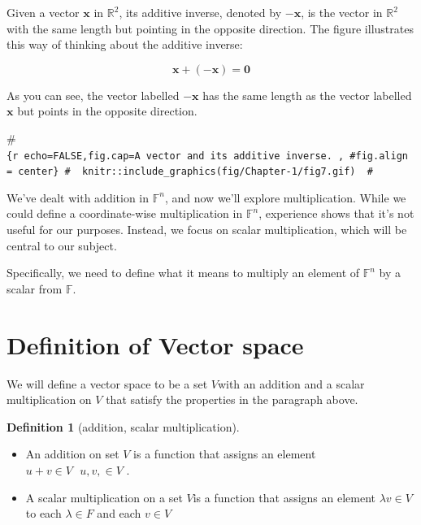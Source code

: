 \documentclass[
]{book}
\providecommand{\tightlist}{%
  \setlength{\itemsep}{0pt}\setlength{\parskip}{0pt}}
\theoremstyle{definition}
\newtheorem{definition}{Definition}[chapter]
\theoremstyle{definition}
\theoremstyle{definition}
\theoremstyle{definition}
\theoremstyle{remark}
\begin{document}
Given a vector \(\mathbf{x}\) in \(\mathbb{R}^2\), its additive inverse, denoted by \(-\mathbf{x}\), is the vector in \(\mathbb{R}^2\) with the same length but pointing in the opposite direction. The figure illustrates this way of thinking about the additive inverse:

\[ \mathbf{x} + (-\mathbf{x}) = \mathbf{0} \]

As you can see, the vector labelled \(-\mathbf{x}\) has the same length as the vector labelled \(\mathbf{x}\) but points in the opposite direction.

\#\texttt{\{r\ echo=FALSE,fig.cap=\textquotesingle{}A\ vector\ and\ its\ additive\ inverse.\textquotesingle{}\ ,\ \#fig.align\ =\ \textquotesingle{}center\textquotesingle{}\}\ \#\ \ knitr::include\_graphics(\textquotesingle{}fig/Chapter-1/fig7.gif\textquotesingle{})\ \ \#}

We've dealt with addition in \(\mathbb{F}^n\), and now we'll explore multiplication. While we could define a coordinate-wise multiplication in \(\mathbb{F}^n\), experience shows that it's not useful for our purposes. Instead, we focus on scalar multiplication, which will be central to our subject.

Specifically, we need to define what it means to multiply an element of \(\mathbb{F}^n\) by a scalar from \(\mathbb{F}\).

\section{Definition of Vector space}\label{definition-of-vector-space}

We will define a vector space to be a set \(V\)with an addition and a scalar multiplication on \(V\) that satisfy the properties in the paragraph above.

\begin{definition}[addition, scalar multiplication]
\protect\hypertarget{def:unnamed-chunk-24}{}\label{def:unnamed-chunk-24}\leavevmode

\begin{itemize}
\tightlist
\item
  An addition on set \(V\) is a function that assigns an element \(u+v\in V ~~~ u,v,\in V\) .
\item
  A scalar multiplication on a set \(V\)is a function that assigns an element \(\lambda v \in V\) to each \(\lambda\in F\) and each \(v \in V\)
\end{itemize}

\end{definition}
\end{document}
